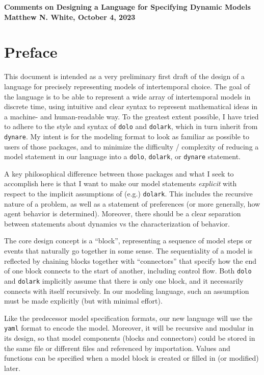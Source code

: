 \documentclass[12pt,pdftex,letterpaper]{article}
\begin{document}
\begin{center}
	\singlespace
	\textbf{Comments on Designing a Language for Specifying Dynamic Models \\ Matthew N. White, October 4, 2023}
\end{center}

\section{Preface}

This document is intended as a very preliminary first draft of the design of a language for precisely representing models of intertemporal choice. The goal of the language is to be able to represent a wide array of intertemporal models in discrete time, using intuitive and clear syntax to represent mathematical ideas in a machine- and human-readable way. To the greatest extent possible, I have tried to adhere to the style and syntax of \texttt{dolo} and \texttt{dolark}, which in turn inherit from \texttt{dynare}. My intent is for the modeling format to look as familiar as possible to users of those packages, and to minimize the difficulty / complexity of reducing a model statement in our language into a \texttt{dolo}, \texttt{dolark}, or \texttt{dynare} statement.

A key philosophical difference between those packages and what I seek to accomplish here is that I want to make our model statements \textit{explicit} with respect to the implicit assumptions of (e.g.) \texttt{dolark}. This includes the recursive nature of a problem, as well as a statement of preferences (or more generally, how agent behavior is determined). Moreover, there should be a clear separation between statements about dynamics vs the characterization of behavior.

The core design concept is a ``block'', representing a sequence of model steps or events that naturally go together in some sense. The sequentiality of a model is reflected by chaining blocks together with ``connectors'' that specify how the end of one block connects to the start of another, including control flow. Both \texttt{dolo} and \texttt{dolark} implicitly assume that there is only one block, and it necessarily connects with itself recursively. In our modeling language, such an assumption must be made explicitly (but with minimal effort).

Like the predecessor model specification formats, our new language will use the \texttt{yaml} format to encode the model. Moreover, it will be recursive and modular in its design, so that model components (blocks and connectors) could be stored in the same file or different files and referenced by importation. Values and functions can be specified when a model block is created or filled in (or modified) later.
\end{document}
